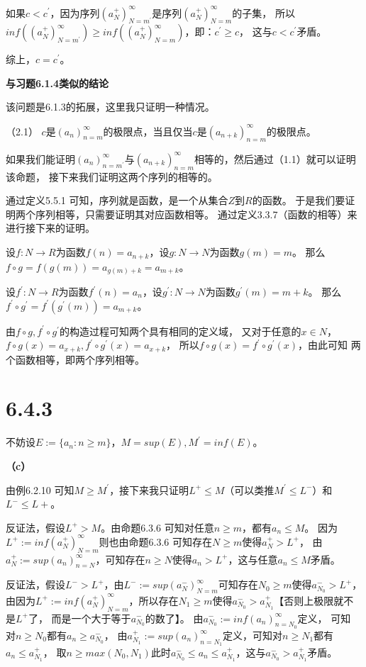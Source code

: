 \documentclass{article}
\theoremstyle{mystyle}
\begin{document}
如果$c < c^\prime$，因为序列$(a_N^+)_{N=m^\prime}^\infty$是序列$(a_N^+)_{N=m}^\infty$的子集，
所以$inf((a_N^+)_{N=m^\prime}^\infty) \geq inf((a_N^+)_{N=m}^\infty)$，即：$c^\prime \geq c$，
这与$c < c^\prime$矛盾。

综上，$c = c^\prime$。

\textbf{与习题6.1.4类似的结论}

该问题是6.1.3的拓展，这里我只证明一种情况。

（2.1） $c$是$(a_n)_{n=m}^\infty$的极限点，当且仅当$c$是$(a_{n+k})_{n=m}^\infty$的极限点。

如果我们能证明$(a_{n})_{n=m^\prime}^\infty$与$(a_{n+k})_{n=m}^\infty$相等的，然后通过（1.1）就可以证明该命题，
接下来我们证明这两个序列的相等的。

通过定义5.5.1 可知，序列就是函数，是一个从集合$Z$到$R$的函数。
于是我们要证明两个序列相等，只需要证明其对应函数相等。
通过定义3.3.7（函数的相等）来进行接下来的证明。

设$f: N \rightarrow R$为函数$f(n)=a_{n+k}$，设$g: N \rightarrow N$为函数$g(m)=m$。
那么$f \circ g = f(g(m)) = a_{g(m)+k} = a_{m+k}$。

设$f^\prime: N \rightarrow R$为函数$f^\prime(n)=a_{n}$，设$g^\prime: N \rightarrow N$为函数$g^\prime(m)=m+k$。
那么$f^\prime \circ g^\prime = f^\prime(g^\prime(m)) = a_{m+k}$。

由$f \circ g,f^\prime \circ g^\prime$的构造过程可知两个具有相同的定义域，
又对于任意的$x \in N$，$f \circ g(x) = a_{x+k}, f^\prime \circ g^\prime(x)=a_{x+k}$，
所以$f \circ g(x) = f^\prime \circ g^\prime(x)$，由此可知 两个函数相等，即两个序列相等。

\section*{6.4.3}

不妨设$E := \{a_n: n \geq m\}$，$M=sup(E),M^\prime=inf(E)$。

\textbf{（c）}

由例6.2.10 可知$M \geq M^\prime$，接下来我只证明$L^+ \leq M$（可以类推$M^\prime \leq L^-$）和$L^- \leq L+$。

反证法，假设$L^+ > M$。由命题6.3.6 可知对任意$n \geq m$，都有$a_n \leq M$。
因为$L^+ := inf(a_N^+)_{N=m}^\infty$则也由命题6.3.6 可知存在$N \geq m$使得$a_N^+ > L^+$，
由$a_N^+ := sup(a_n)_{n=N}^\infty$，可知存在$n \geq N$使得$a_n > L^+$，这与任意$a_n \leq M$矛盾。

反证法，假设$L^- > L^+$，由$L^- := sup(a_N^-)_{N=m}^\infty$可知存在$N_0 \geq m$使得$a_{N_0}^- > L^+$，
由因为$L^+ := inf(a_N^+)_{N=m}^\infty$，所以存在$N_1 \geq m$使得$a_{N_0}^- > a_{N_1}^+$【否则上极限就不是$L^+$了，
而是一个大于等于$a_{N_0}^-$的数了】。
由$a_{N_0}^- := inf(a_n)_{n=N_0}^\infty$定义， 可知 对$n \geq N_0$都有$a_n \geq a_{N_0}^-$，
由$a_{N_1}^+ := sup(a_n)_{n=N_1}^\infty$定义，可知对$n \geq N_1$都有$a_n \leq a_{N_1}^+$，
取$n \geq max(N_0,N_1)$此时$a_{N_0}^- \leq a_n \leq a_{N_1}^+$，这与$a_{N_0}^- > a_{N_1}^+$矛盾。
\end{document}
